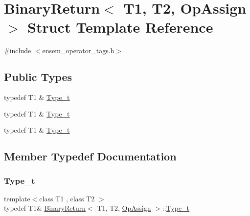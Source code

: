 \hypertarget{structBinaryReturn_3_01T1_00_01T2_00_01OpAssign_01_4}{}\section{Binary\+Return$<$ T1, T2, Op\+Assign $>$ Struct Template Reference}
\label{structBinaryReturn_3_01T1_00_01T2_00_01OpAssign_01_4}


{\ttfamily \#include $<$ensem\+\_\+operator\+\_\+tags.\+h$>$}

\subsection*{Public Types}
\begin{DoxyCompactItemize}
\item 
typedef T1 \& \mbox{\hyperlink{structBinaryReturn_3_01T1_00_01T2_00_01OpAssign_01_4_a53342a562eafe32bec01f522b2e76d49}{Type\+\_\+t}}
\item 
typedef T1 \& \mbox{\hyperlink{structBinaryReturn_3_01T1_00_01T2_00_01OpAssign_01_4_a53342a562eafe32bec01f522b2e76d49}{Type\+\_\+t}}
\item 
typedef T1 \& \mbox{\hyperlink{structBinaryReturn_3_01T1_00_01T2_00_01OpAssign_01_4_a53342a562eafe32bec01f522b2e76d49}{Type\+\_\+t}}
\end{DoxyCompactItemize}


\subsection{Member Typedef Documentation}
\mbox{\label{structBinaryReturn_3_01T1_00_01T2_00_01OpAssign_01_4_a53342a562eafe32bec01f522b2e76d49}} 
\subsubsection{\texorpdfstring{Type\_t}{Type\_t}\hspace{0.1cm}{\footnotesize\ttfamily [1/3]}}
{\footnotesize\ttfamily template$<$class T1 , class T2 $>$ \\
typedef T1\& \mbox{\hyperlink{structBinaryReturn}{Binary\+Return}}$<$ T1, T2, \mbox{\hyperlink{structOpAssign}{Op\+Assign}} $>$\+::\mbox{\hyperlink{structBinaryReturn_3_01T1_00_01T2_00_01OpAssign_01_4_a53342a562eafe32bec01f522b2e76d49}{Type\+\_\+t}}}

